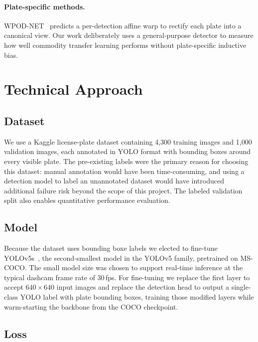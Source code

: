 \documentclass[times,10pt,twocolumn]{article}
\begin{document}
\paragraph{Plate-specific methods.}
WPOD-NET~\cite{silva2018wpodnet} predicts a per-detection affine warp
to rectify each plate into a canonical view. Our work deliberately uses
a general-purpose detector to measure how well commodity transfer
learning performs without plate-specific inductive bias.

\section{Technical Approach}
\label{sec:method}

\subsection{Dataset}
\label{sec:data}

We use a Kaggle license-plate dataset containing 4,300 training images and
1,000 validation images, each annotated in YOLO format with bounding boxes
around every visible plate.
The pre-existing labels were the primary reason for choosing this dataset:
manual annotation would have been  time-consuming, and using a
detection model to label an unannotated dataset would have introduced
additional failure risk beyond the scope of this project.
The labeled validation split also enables quantitative performance evaluation.

\subsection{Model}
\label{sec:model}

Because the dataset uses bounding boxe labels we elected to fine-tune
YOLOv5s~\cite{jocher2020yolov5}, the second-smallest model in the YOLOv5
family, pretrained on MS-COCO.
The small model size was chosen to support real-time inference at the typical
dashcam frame rate of 30\,fps.
For fine-tuning we replace the first layer to accept $640\!\times\!640$ input
images and replace the detection head to output a single-class YOLO label with
plate bounding boxes, training those modified layers while warm-starting the
backbone from the COCO checkpoint.

\subsection{Loss}
\label{sec:loss}
\end{document}
